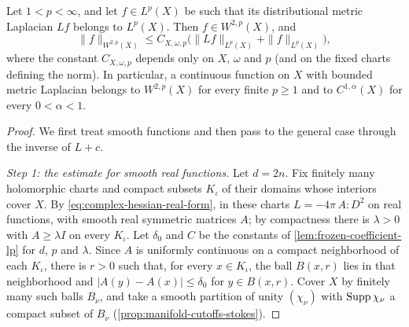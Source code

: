 \begin{proposition}\label{prop:compact-metric-laplacian-lp}
Let $1<p<\infty$, and let $f\in L^p(X)$ be such that its distributional metric Laplacian $Lf$ belongs to $L^p(X)$. Then $f\in W^{2,p}(X)$, and
\begin{equation}\label{eq:compact-metric-laplacian-lp}
 \|f\|_{W^{2,p}(X)}\leq C_{X,\omega,p}
       \bigl(\|Lf\|_{L^p(X)}+\|f\|_{L^p(X)}\bigr),
\end{equation}
where the constant $C_{X,\omega,p}$ depends only on $X$, $\omega$ and $p$ (and on the fixed charts defining the norm). In particular, a continuous function on $X$ with bounded metric Laplacian belongs to $W^{2,p}(X)$ for every finite $p\geq1$ and to $C^{1,\alpha}(X)$ for every $0<\alpha<1$.
\end{proposition}
\begin{proof}
We first treat smooth functions and then pass to the general case through the inverse of $L+c$.

\emph{Step 1: the estimate for smooth real functions.} Let $d=2n$. Fix finitely many holomorphic charts and compact subsets $K_\iota$ of their domains whose interiors cover $X$. By \eqref{eq:complex-hessian-real-form}, in these charts $L=-4\pi\,A:D^2$ on real functions, with smooth real symmetric matrices $A$; by compactness there is $\lambda>0$ with $A\geq\lambda I$ on every $K_\iota$. Let $\delta_0$ and $C$ be the constants of \cref{lem:frozen-coefficient-lp} for $d$, $p$ and $\lambda$. Since $A$ is uniformly continuous on a compact neighborhood of each $K_\iota$, there is $r>0$ such that, for every $x\in K_\iota$, the ball $B(x,r)$ lies in that neighborhood and $|A(y)-A(x)|\leq\delta_0$ for $y\in B(x,r)$. Cover $X$ by finitely many such balls $B_\nu$, and take a smooth partition of unity $(\chi_\nu)$ with $\operatorname{Supp}\chi_\nu$ a compact subset of $B_\nu$ (\cref{prop:manifold-cutoffs-stokes}).


\end{proof}
